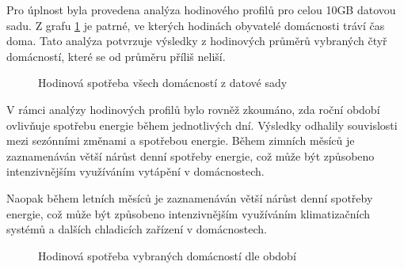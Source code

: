 \documentclass[FM,BP,fonts]{tulthesis}
\begin{document}
Pro úplnost byla provedena analýza hodinového profilů pro celou 10GB datovou sadu. Z grafu \ref{fig:hodina_all} je patrné, ve kterých hodinách obyvatelé domácnosti tráví čas doma. Tato analýza potvrzuje výsledky z hodinových průměrů vybraných čtyř domácností, které se od průměru příliš neliší.

\begin{figure}[htbp]
	\centering
	\caption{Hodinová spotřeba všech domácností z datové sady}
	\label{fig:hodina_all}
\end{figure}

V rámci analýzy hodinových profilů bylo rovněž zkoumáno, zda roční období ovlivňuje spotřebu energie během jednotlivých dní. Výsledky odhalily souvislosti mezi sezónními změnami a spotřebou energie. Během zimních měsíců je zaznamenáván větší nárůst denní spotřeby energie, což může být způsobeno intenzivnějším využíváním vytápění v domácnostech.

Naopak během letních měsíců je zaznamenáván větší nárůst denní spotřeby energie, což může být způsobeno intenzivnějším využíváním klimatizačních systémů a dalších chladicích zařízení v domácnostech. \newpage

\begin{figure}[htbp]
	\centering
	\caption{Hodinová spotřeba vybraných domácností dle období}
	\label{fig:hodina_quarters}
\end{figure}
\end{document}
